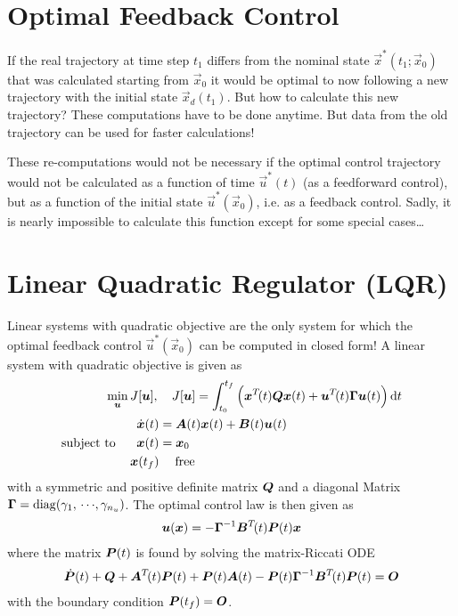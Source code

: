 	\section{Optimal Feedback Control}
		If the real trajectory at time step \( t_1 \) differs from the nominal state \( \vec{x}^\ast(t_1; \vec{x}_0) \) that was calculated starting from \( \vec{x}_0 \) it would be optimal to now following a new trajectory with the initial state \( \vec{x}_d(t_1) \). But how to calculate this new trajectory? These computations have to be done anytime. But data from the old trajectory can be used for faster calculations!

		These re-computations would not be necessary if the optimal control trajectory would not be calculated as a function of time \( \vec{u}^\ast(t) \) (as a feedforward control), but as a function of the initial state \( \vec{u}^\ast(\vec{x}_0) \), i.e. as a feedback control. Sadly, it is nearly impossible to calculate this function except for some special cases\dots

	\section{Linear Quadratic Regulator (LQR)}
		Linear systems with quadratic objective are the only system for which the optimal feedback control \( \vec{u}^\ast(\vec{x}_0) \) can be computed in closed form! A linear system with quadratic objective is given as
		\begin{align*}
			\min_{\bm{u}} &\, J[\bm{u}],\quad J[\bm{u}] = \int_{t_0}^{t_f} \Big( \bm{x}^T\!(t) \bm{Q} \bm{x}(t) + \bm{u}^T\!(t) \bm{\Gamma} \bm{u}(t) \Big) \dd{t} \\
			\mathrm{subject~to}\quad &\,
				\begin{alignedat}{2}
					\dot{\bm{x}}(t) &= \bm{A}(t) \bm{x}(t) + \bm{B}(t) \bm{u}(t) \\
					\bm{x}(t) &= \bm{x}_0 \\
					\bm{x}(t_f) &\phantom{=}\,\,\, \text{free}
				\end{alignedat}
		\end{align*}
		with a symmetric and positive definite matrix \( \bm{Q} \) and a diagonal Matrix \( \bm{\Gamma} = \operatorname{diag}(\gamma_1,\,\cdots\!,\gamma_{n_u}) \). The optimal control law is then given as
		\begin{align*}
			\bm{u}(\bm{x}) = -\bm{\Gamma}^{-1} \bm{B}^T\!(t) \bm{P}(t) \bm{x}
		\end{align*}
		where the matrix \( \bm{P}(t) \) is found by solving the matrix-Riccati ODE
		\begin{align*}
			\dot{\bm{P}}(t) + \bm{Q} + \bm{A}^T\!(t) \bm{P}(t) + \bm{P}(t) \bm{A}(t) - \bm{P}(t) \bm{\Gamma}^{-1} \bm{B}^T\!(t) \bm{P}(t) = \bm{O}
		\end{align*}
		with the boundary condition \( \bm{P}(t_f) = \bm{O} \).

